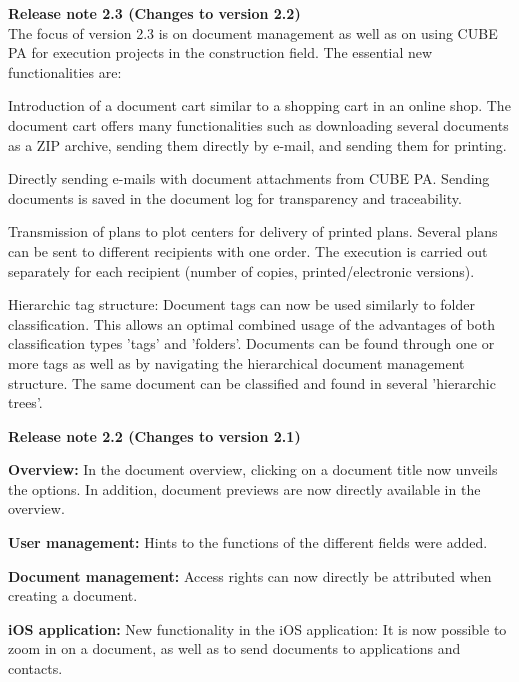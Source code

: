 \vspace{\baselineskip}

\textbf{Release note 2.3 (Changes to version 2.2)} \\

The focus of version 2.3 is on document management as well as on using CUBE PA for execution projects in the construction field. The essential new functionalities are:
\begin{compactitem}
	\item Introduction of a document cart similar to a shopping cart in an online shop. The document cart offers many functionalities such as downloading several documents as a ZIP archive, sending them directly by e-mail, and sending them for printing.
	\item Directly sending e-mails with document attachments from CUBE PA. Sending documents is saved in the document log for transparency and traceability.
	\item Transmission of plans to plot centers for delivery of printed plans. Several plans can be sent to different recipients with one order. The execution is carried out separately for each recipient (number of copies, printed/electronic versions).
	\item Hierarchic tag structure: Document tags can now be used similarly to folder classification. This allows an optimal combined usage of the advantages of both classification types 'tags' and 'folders'. Documents can be found through one or more tags as well as by navigating the hierarchical document management structure. The same document can be classified and found in several 'hierarchic trees'.
\end{compactitem}

\vspace{\baselineskip}

\textbf{Release note 2.2 (Changes to version 2.1)} \\

\begin{compactitem}
	\item \textbf{Overview:} In the document overview, clicking on a document title now unveils the options. In addition, document previews are now directly available in the overview.
	\item \textbf{User management:} Hints to the functions of the different fields were added.
	\item \textbf{Document management:} Access rights can now directly be attributed when creating a document.
	\item \textbf{iOS application:} New functionality in the iOS application: It is now possible to zoom in on a document, as well as to send documents to applications and contacts.
\end{compactitem}


